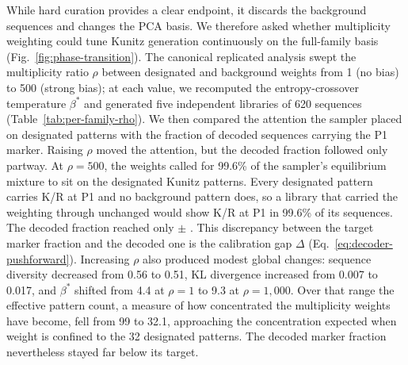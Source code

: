 While hard curation provides a clear endpoint, it discards the background sequences and changes
the PCA basis. We therefore asked whether multiplicity weighting could tune Kunitz generation
continuously on the full-family basis (Fig.~\ref{fig:phase-transition}). The canonical
replicated analysis swept the multiplicity ratio $\rho$ between designated and background
weights from 1 (no bias) to 500 (strong bias); at each value, we recomputed the entropy-crossover temperature
$\beta^{*}$ and generated five independent libraries of 620 sequences (Table~\ref{tab:per-family-rho}).
We then compared the attention the sampler placed on designated patterns with the fraction of
decoded sequences carrying the P1 marker. Raising $\rho$ moved the attention, but the decoded
fraction followed only partway. At $\rho=500$, the weights called for 99.6\% of the sampler's
equilibrium mixture to sit on the designated Kunitz patterns. Every designated pattern carries
K/R at P1 and no background pattern does, so a library that carried the weighting through
unchanged would show K/R at P1 in 99.6\% of its sequences. The decoded fraction reached only
\KunitzFobsFiveHundred{} $\pm$ \KunitzFobsFiveHundredSD{}. This discrepancy between the target
marker fraction and the decoded one is the calibration gap $\Delta$
(Eq.~\ref{eq:decoder-pushforward}).
Increasing $\rho$ also produced modest global changes:
sequence diversity decreased from 0.56 to 0.51, KL divergence increased from 0.007 to 0.017,
and $\beta^{*}$ shifted from 4.4 at $\rho=1$ to 9.3 at $\rho=1{,}000$. Over that range the
effective pattern count, a measure of how concentrated the multiplicity
weights have become, fell from 99 to 32.1, approaching the concentration expected when weight
is confined to the 32 designated patterns. The decoded marker fraction nevertheless stayed far
below its target.

